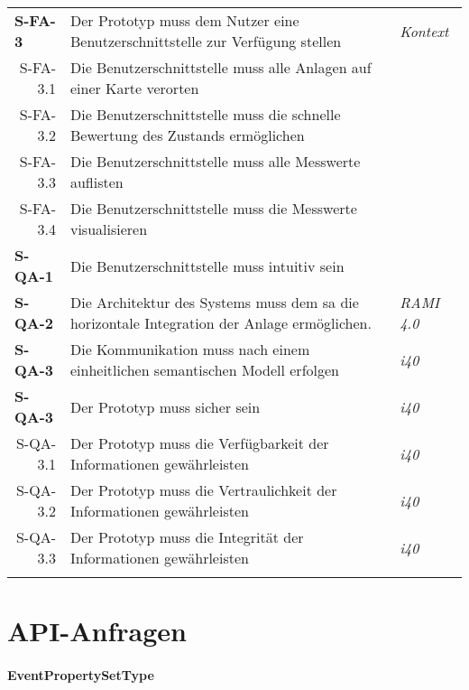 \begin{tabularx}{\textwidth}{@{}lXp{2cm}@{}}
      \textbf{S-FA-3}              &  Der Prototyp muss dem Nutzer eine Benutzerschnittstelle zur Verfügung stellen    & \textit{Kontext}  \\
      \multicolumn{1}{r}{S-FA-3.1} &  Die Benutzerschnittstelle muss alle Anlagen auf einer Karte verorten \\
      \multicolumn{1}{r}{S-FA-3.2} &  Die Benutzerschnittstelle muss die schnelle Bewertung des Zustands ermöglichen \\
      \multicolumn{1}{r}{S-FA-3.3} &  Die Benutzerschnittstelle muss alle Messwerte auflisten \\
      \multicolumn{1}{r}{S-FA-3.4} &  Die Benutzerschnittstelle muss die Messwerte visualisieren \\
      \textbf{S-QA-1}              & Die Benutzerschnittstelle muss intuitiv sein   \\
      \textbf{S-QA-2}              & Die Architektur des Systems muss dem \ac{sa} die horizontale Integration der Anlage ermöglichen.   & \textit{RAMI 4.0} \\
      \textbf{S-QA-3}              &  Die Kommunikation muss nach einem einheitlichen semantischen Modell erfolgen  & \textit{\ac{i40}} \\
      \textbf{S-QA-3}              &  Der Prototyp muss sicher sein  & \textit{\ac{i40}} \\
      \multicolumn{1}{r}{S-QA-3.1}              &  Der Prototyp muss die Verfügbarkeit der Informationen gewährleisten  & \textit{\ac{i40}} \\
      \multicolumn{1}{r}{S-QA-3.2}              &  Der Prototyp muss die Vertraulichkeit der Informationen gewährleisten  & \textit{\ac{i40}} \\
      \multicolumn{1}{r}{S-QA-3.3}              &  Der Prototyp muss die Integrität der Informationen gewährleisten & \textit{\ac{i40}} \\
      \addlinespace
      \bottomrule
      \caption{Anforderungen aus Systemebene}
      \label{system_anforderungen}
  \end{tabularx}

\section{API-Anfragen}

\paragraph{EventPropertySetType}

